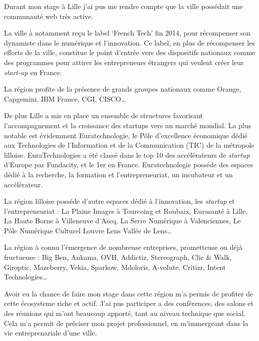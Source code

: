 Durant mon stage à Lille j'ai pus me rendre compte que la ville
possédait une communauté web très active.

\bigskip

La ville à notamment reçu le label `French Tech' fin 2014, pour
récompenser son dynamiste dans le numérique et l'innovation. Ce label,
en plus de récompenser les efforts de la ville, constitue le point
d'entrée vers des dispositifs nationaux comme des programmes pour
attirer les entrepreneurs étrangers qui veulent créer leur
\emph{start-up} en France.

\bigskip

La région profite de la présence de grands groupes nationaux comme
Orange, Capgemini, IBM France, CGI, CISCO\ldots{}

\bigskip

De plus Lille a mis en place un ensemble de structures favorisant
l'accompagnement et la croissance des startups vers un marché mondial.
La plus notable est évidemment Euratechnologie, le Pôle d'excellence
économique dédié aux Technologies de l'Information et de la
Communication (TIC) de la métropole lilloise. EuraTechnologies a été
classé dans le top 10 des accélérateurs de \emph{startup} d'Europe par
Fundacity, et le 1er en France. Euratechnologie posséde des espaces
dédié à la recherche, la formation et l'entrepreneuriat, un incubateur
et un accélérateur.

\bigskip

La région lilloise posséde d'autre espaces dédié à l'innovation, les
\emph{startup} et l'entrepreneuriat : La Plaine Images à Tourcoing et
Roubaix, Eurasanté à Lille, La Haute Borne à Villeneuve d'Ascq, La Serre
Numérique à Valenciennes, Le Pôle Numérique Culturel Louvre Lens Vallée
de Lens\ldots{}

\bigskip

La région à connu l'émergence de nombreuse entreprises, prometteuse ou
déjà fructueuse : Big Ben, Ankama, OVH, Addictiz, Stereograph, Clic \&
Walk, Giroptic, Mazeberry, Vekia, Sparkow, Mdoloris, A-volute, Critizr,
Intent Technologies\ldots{}

\bigskip

Avoir eu la chance de faire mon stage dans cette région m'a permis de
profiter de cette écosysteme riche et actif. J'ai pus participer a des
conférences, des salons et des réunions qui m'ont beaucoup apporté, tant
au niveau technique que social. Cela m'a permit de préciser mon projet
professionnel, en m'immergeant dans la vie entreprenariale d'une ville.

